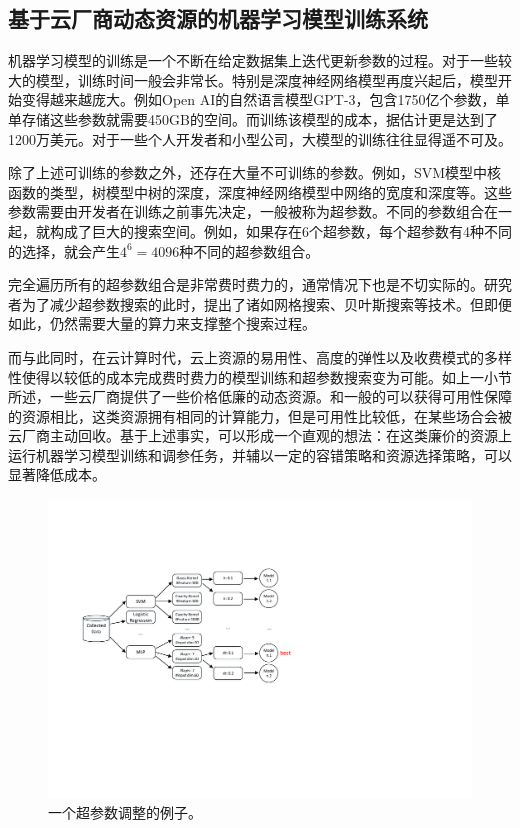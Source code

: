 \subsection{基于云厂商动态资源的机器学习模型训练系统}
机器学习模型的训练是一个不断在给定数据集上迭代更新参数的过程。对于一些较大的模型，训练时间一般会非常长。特别是深度神经网络模型再度兴起后，模型开始变得越来越庞大。例如Open AI的自然语言模型GPT-3，包含1750亿个参数，单单存储这些参数就需要450GB的空间。而训练该模型的成本，据估计更是达到了1200万美元。对于一些个人开发者和小型公司，大模型的训练往往显得遥不可及。

除了上述可训练的参数之外，还存在大量不可训练的参数。例如，SVM模型中核函数的类型，树模型中树的深度，深度神经网络模型中网络的宽度和深度等。这些参数需要由开发者在训练之前事先决定，一般被称为超参数。不同的参数组合在一起，就构成了巨大的搜索空间。例如，如果存在6个超参数，每个超参数有4种不同的选择，就会产生$4^6=4096$种不同的超参数组合。

完全遍历所有的超参数组合是非常费时费力的，通常情况下也是不切实际的。研究者为了减少超参数搜索的此时，提出了诸如网格搜索、贝叶斯搜索等技术。但即便如此，仍然需要大量的算力来支撑整个搜索过程。

而与此同时，在云计算时代，云上资源的易用性、高度的弹性以及收费模式的多样性使得以较低的成本完成费时费力的模型训练和超参数搜索变为可能。如上一小节所述，一些云厂商提供了一些价格低廉的动态资源。和一般的可以获得可用性保障的资源相比，这类资源拥有相同的计算能力，但是可用性比较低，在某些场合会被云厂商主动回收。基于上述事实，可以形成一个直观的想法：在这类廉价的资源上运行机器学习模型训练和调参任务，并辅以一定的容错策略和资源选择策略，可以显著降低成本。

\begin{figure}[h]
    \centerline{\includegraphics[width=\textwidth]{figures/hpt.pdf}}
    \caption{一个超参数调整的例子。}
    \label{hpt_example}
\end{figure}

